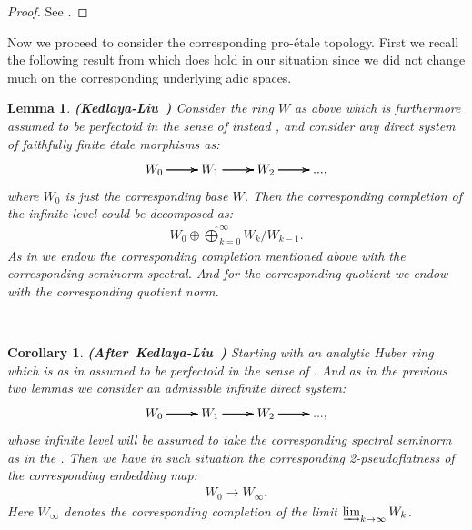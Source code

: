 \documentclass[12pt]{amsart}
\newtheorem{lemma}[theorem]{Lemma}
\newtheorem{corollary}[theorem]{Corollary}
\theoremstyle{definition}
\numberwithin{equation}{section}
\begin{document}
\begin{proof}
See \cite[Proposition 3.4.3]{KL2}.	
\end{proof}


\indent Now we proceed to consider the corresponding pro-\'etale topology. First we recall the following result from \cite[Lemma 3.4.4]{KL2} which does hold in our situation since we did not change much on the corresponding underlying adic spaces.\\




\begin{lemma}  \mbox{\bf{(Kedlaya-Liu \cite[Lemma 3.4.4]{KL2})}}
Consider the ring $W$ as above which is furthermore assumed to be perfectoid in the sense of instead \cite[Definition 2.1.1]{Ked1}, and consider any direct system of faithfully finite \'etale morphisms as:
\[
\xymatrix@C+0pc@R+0pc{
W_0 \ar[r] \ar[r] \ar[r] &W_1 \ar[r] \ar[r] \ar[r] &W_2  \ar[r] \ar[r] \ar[r] &...,   
}
\]	
where $W_0$ is just the corresponding base $W$. Then the corresponding completion of the infinite level could be decomposed as:
\begin{align}
W_0\oplus\widehat{\bigoplus}_{k=0}^\infty W_k/W_{k-1}.	
\end{align}
As in \cite[Lemma 3.4.4]{KL2} we endow the corresponding completion mentioned above with the corresponding seminorm spectral. And for the corresponding quotient we endow with the corresponding quotient norm.
\end{lemma}


\



\begin{corollary}\mbox{\bf{(After Kedlaya-Liu \cite[Corollary 3.4.5]{KL2})}} 
Starting with an analytic Huber ring which is as in \cite[Corollary 3.4.5]{KL2} assumed to be perfectoid in the sense of \cite[Definition 2.1.1]{Ked1}. And as in the previous two lemmas we consider an admissible infinite direct system:
\[
\xymatrix@C+0pc@R+0pc{
W_{0} \ar[r] \ar[r] \ar[r] &W_{1} \ar[r] \ar[r] \ar[r] &W_{2}  \ar[r] \ar[r] \ar[r] &...,   
}
\]
whose infinite level will be assumed to take the corresponding spectral seminorm as in the \cite[Corollary 3.4.5]{KL2}. Then we have in such situation the corresponding 2-pseudoflatness of the corresponding embedding map:
\begin{align}
W_{0}\rightarrow W_{\infty}.
\end{align}
Here $W_{\infty}$ denotes the corresponding completion of the limit $\varinjlim_{k\rightarrow\infty}W_{k}$.
\end{corollary}
\end{document}
